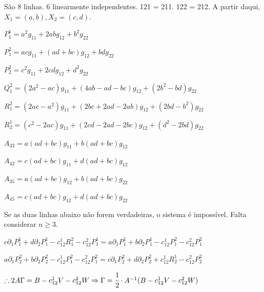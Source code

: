 \documentclass[10pt,a4paper]{article}
\begin{document}
		S\~ao 8 linhas. 6 linearmente independentes. 121 = 211. 122 = 212. A partir daqui, $X_1 = (a,b), X_2 = (c,d)$.

		$P_1^1 = a^2 g_{11} + 2ab g_{12} + b^2 g_{22}$

		$P_1^2 = a c g_{11} + (a d + b c) g_{12} + b d g_{22}$

		$P_2^2 = c^2 g_{11} + 2cd g_{12} + d^2 g_{22}$

		$Q_1^2 = (2 a^2 - ac) g_{11} + (4ab - ad - bc) g_{12} + (2b^2 - bd) g_{22}$

		$R_1^2 = (2ac - a^2) g_{11} + (2bc + 2ad - 2ab) g_{12} + (2bd - b^2) g_{22}$

		$R_2^1 = (c^2 - 2ac) g_{11} + (2cd - 2ad - 2bc) g_{12} + (d^2 - 2bd) g_{22}$

		$A_{32} = a(ad+bc) g_{11} + b(ad+bc) g_{12}$

		$A_{42} = c(ad+bc) g_{11} + d(ad+bc) g_{12}$

		$A_{35} = a(ad+bc) g_{12} + b(ad+bc) g_{22}$

		$A_{45} = c(ad+bc) g_{12} + d(ad+bc) g_{22}$

		Se as duas linhas abaixo n\~ao forem verdadeiras, o sistema \'e imposs\'ivel. Falta considerar $n \ge 3$.

		$c \partial_1 P_1^1 + d \partial_2 P_1^1 - c_{12}^1 R_1^2 - c_{12}^2 P_1^1 = a \partial_1 P_1^1 + b \partial_2 P_1^1 - c_{12}^1 P_1^2 - c_{12}^2 P_1^2$

		$a \partial_1 P_2^2 + b\partial_2 P_2^2 - c_{12}^1 P_1^2 - c_{12}^2 P_1^2 = c \partial_1 P_2^2 + d \partial_2 P_2^2 + c_{12}^1 R_2^1 - c_{12}^2 P_2^2$

		$\therefore 2 A \Gamma = B - c_{12}^1 V - c_{12}^2 W \Rightarrow \Gamma = \cfrac{1}{2}\cdot A^{-1} (B - c_{12}^1 V - c_{12}^2 W)$

		\vspace{3mm}
\end{document}
